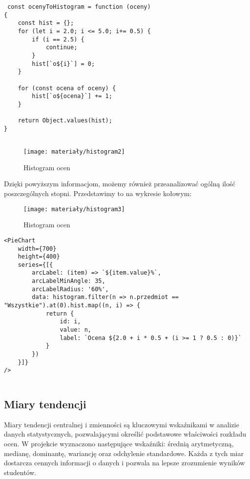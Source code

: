 \begin{empty}
	\begin{verbatim}
 const ocenyToHistogram = function (oceny)
{
	const hist = {};
	for (let i = 2.0; i <= 5.0; i+= 0.5) {
		if (i == 2.5) {
			continue;
		}
		hist[`o${i}`] = 0;
	}
	
	for (const ocena of oceny) {
		hist[`o${ocena}`] += 1;
	}
	
	return Object.values(hist);
}
		
	\end{verbatim}
	\vspace{-10pt}
\end{empty}

\begin{figure}[ht]
	\centering
	\texttt{[image: materiały/histogram2]}
	\caption{Histogram ocen}
\end{figure}
\newpage
Dzięki powyższym informacjom, możemy również przeanalizować ogólną ilość poszczególnych stopni. Przedstawimy to na wykresie kołowym:
\begin{figure}[ht]
	\centering
	\texttt{[image: materiały/histogram3]}
	\caption{Histogram ocen}
\end{figure}

\begin{empty}
	\begin{verbatim}
<PieChart 
	width={700}
	height={400}
	series={[{
		arcLabel: (item) => `${item.value}%`,
		arcLabelMinAngle: 35,
		arcLabelRadius: '60%',
		data: histogram.filter(n => n.przedmiot == "Wszystkie").at(0).hist.map((n, i) => {
			return {
				id: i,
				value: n,
				label: `Ocena ${2.0 + i * 0.5 + (i >= 1 ? 0.5 : 0)}`
			}
		})
	}]}
/>
		
	\end{verbatim}
	\vspace{-10pt}
\end{empty}

\subsection{Miary tendencji}
Miary tendencji centralnej i zmienności są kluczowymi wskaźnikami w analizie danych statystycznych, pozwalającymi określić podstawowe właściwości rozkładu ocen. W projekcie wyznaczono następujące wskaźniki: średnią arytmetyczną, medianę, dominantę, wariancję oraz odchylenie standardowe. Każda z tych miar dostarcza cennych informacji o danych i pozwala na lepsze zrozumienie wyników studentów.

